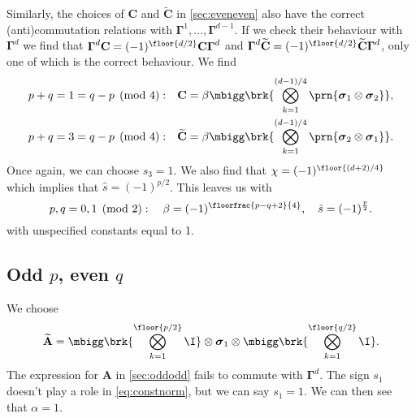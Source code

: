 \documentclass[11pt]{article}
\newcommand{\Gammab}{\boldsymbol{\Gamma}}
\newcommand{\A}{\mathbf{A}}
\renewcommand{\C}{\mathbf{C}}
\newcommand{\At}{\widetilde{\A}}
\newcommand{\Ct}{\widetilde{\C}}
\newcommand{\sigmab}{\boldsymbol{\sigma}}
\begin{document}
Similarly, the choices of $\C$ and $\Ct$ in \cref{sec:eveneven} also have the correct (anti)commutation relations with $\Gammab^1, \ldots, \Gammab^{d-1}$.
If we check their behaviour with $\Gammab^d$ we find that $\Gammab^d \C = (-1)^{\floor{d/2}}\C \Gammab^d$ and $\Gammab^d \Ct = (-1)^{\floor{d/2}} \Ct \Gammab^d$, only one of which is the correct behaviour.
We find
%
\begin{equation*}
\begin{aligned}
  p+q &= 1 = q-p \pmod 4: &
  \C &=  \beta \mbigg\brk{\bigotimes_{k=1}^{(d-1)/4} \prn{\sigmab_1 \otimes \sigmab_2}},
  \\
  p+q &= 3 = q-p \pmod 4: &
  \Ct &= \beta \mbigg\brk{\bigotimes_{k=1}^{(d-1)/4} \prn{\sigmab_2 \otimes \sigmab_1}}.
\end{aligned}
\end{equation*}
%
Once again, we can choose $s_3 = 1$.
We also find that $\chi = (-1)^{\floor{(d+2)/4}}$ which implies that $\hat{s} = (-1)^{p/2}$.
This leaves us with
%
\begin{equation}\label{eq:constevenodd}
  p, q = 0,1 \pmod 2 : \quad
  \beta = (-1)^{\floorfrac{p-q+2}{4}}, \quad
  \hat{s} = (-1)^{\frac{p}{2}}.
\end{equation}
%
with unspecified constants equal to 1.



\subsection{Odd \texorpdfstring{$p$}{p}, even \texorpdfstring{$q$}{q}}\label{sec:oddeven}

We choose
%
\begin{equation*}
  \At =
        \mbigg\brk{\bigotimes_{k=1}^{\floor{p/2}} \I}
        \otimes \sigmab_1
        \otimes \mbigg\brk{\bigotimes_{k=1}^{\floor{q/2}} \I}.
\end{equation*}
%
The expression for $\A$ in \cref{sec:oddodd} fails to commute with $\Gammab^d$.
The sign $s_1$ doesn't play a role in \cref{eq:constnorm}, but we can say $s_1 = 1$.
We can then see that $\alpha = 1$.
\end{document}
